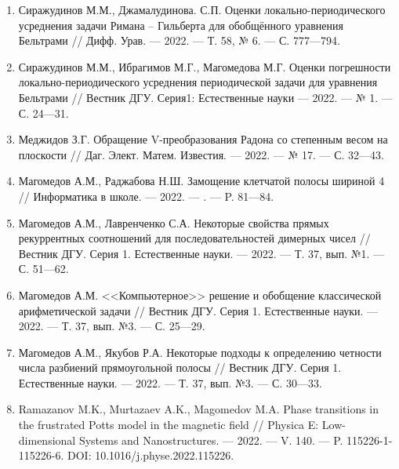 \begin{enumerate}[1]

    \item
    Сиражудинов М.М., Джамалудинова. С.П.
    Оценки локально-периодического усреднения задачи Римана – Гильберта для обобщённого уравнения Бельтрами
    //
    Дифф. Урав.
    --- 2022.
    --- Т. 58, № 6.
    --- С. 777---794.

    \item
    Сиражудинов М.М., Ибрагимов М.Г., Магомедова М.Г.
    Оценки погрешности локально-периодического усреднения периодической задачи для уравнения Бельтрами
    //
    Вестник ДГУ. Серия1: Естественные науки
    --- 2022.
    --- № 1.
    --- С. 24---31.



    \item
    Меджидов З.Г.
    Обращение V-преобразования Радона со степенным весом на плоскости
    //
    Даг. Элект. Матем. Известия.
    --- 2022.
    --- № 17.
    --- С. 32---43.



    \item
    Магомедов А.М., Раджабова Н.Ш.
    Замощение клетчатой полосы шириной 4
    //
    Информатика в школе.
    --- 2022.
    --- .
    --- P. 81---84.

    \item
    Магомедов А.М., Лавренченко С.А.
    Некоторые свойства прямых рекуррентных соотношений для последовательностей димерных чисел
    //
    Вестник ДГУ. Серия 1. Естественные науки.
    --- 2022.
    --- Т. 37, вып. №1.
    --- С. 51---62.

    \item
    Магомедов А.М.
    <<Компьютерное>> решение и обобщение классической арифметической задачи
    //
    Вестник ДГУ. Серия 1. Естественные науки.
    --- 2022.
    --- Т. 37, вып. №3.
    --- С. 25---29.

    \item
    Магомедов А.М., Якубов Р.А.
    Некоторые подходы к определению четности числа разбиений прямоугольной полосы
    //
    Вестник ДГУ. Серия 1. Естественные науки.
    --- 2022.
    --- Т. 37, вып. №3.
    --- С. 30---33.



    \item
    Ramazanov M.K., Murtazaev A.K., Magomedov M.A.
    Phase transitions in the frustrated Potts model in the magnetic field
    //
    Physica E: Low-dimensional Systems and Nanostructures.
    --- 2022.
    --- V. 140.
    --- P. 115226-1-115226-6. DOI: 10.1016/j.physe.2022.115226.


\end{enumerate}
